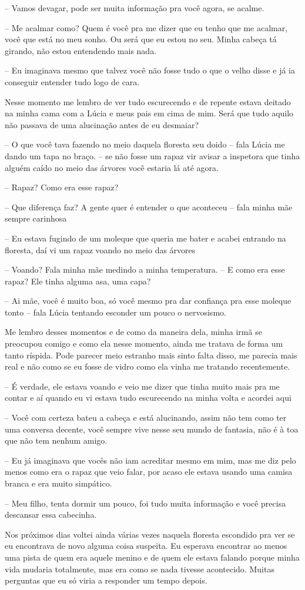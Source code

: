 -- Vamos devagar, pode ser muita informação pra você agora, se acalme.

-- Me acalmar como? Quem é você pra me dizer que eu tenho que me acalmar, você que está no meu sonho. Ou será que eu estou no seu. Minha cabeça tá girando, não estou entendendo mais nada.

-- Eu imaginava mesmo que talvez você não fosse tudo o que o velho disse e já ia conseguir entender tudo logo de cara.

Nesse momento me lembro de ver tudo escurecendo e de repente estava deitado na minha cama com a Lúcia e meus pais em cima de mim. Será que tudo aquilo não passava de uma alucinação antes de eu desmaiar?

-- O que você tava fazendo no meio daquela floresta seu doido -- fala Lúcia me dando um tapa no braço. -- se não fosse um rapaz vir avisar a inspetora que tinha alguém caído no meio das árvores você estaria lá até agora.

-- Rapaz? Como era esse rapaz?

-- Que diferença faz? A gente quer é entender o que aconteceu -- fala minha mãe sempre carinhosa

-- Eu estava fugindo de um moleque que queria me bater e acabei entrando na floresta, daí vi um rapaz voando no meio das árvores

-- Voando? Fala minha mãe medindo a minha temperatura. -- E como era esse rapaz? Ele tinha alguma asa, uma capa?

-- Ai mãe, você é muito boa, só você mesmo pra dar confiança pra esse moleque tonto -- fala Lúcia tentando esconder um pouco o nervosismo.

Me lembro desses momentos e de como da maneira dela, minha irmã se preocupou comigo e como ela nesse momento, ainda me tratava de forma um tanto ríspida. Pode parecer meio estranho mais sinto falta disso, me parecia mais real e não como se eu fosse de vidro como ela vinha me tratando recentemente.

-- É verdade, ele estava voando e veio me dizer que tinha muito mais pra me contar e aí quando eu vi estava tudo escurecendo na minha volta e acordei aqui

-- Você com certeza bateu a cabeça e está alucinando, assim não tem como ter uma conversa decente, você sempre vive nesse seu mundo de fantasia, não é à toa que não tem nenhum amigo.

-- Eu já imaginava que vocês não iam acreditar mesmo em mim, mas me diz pelo menos como era o rapaz que veio falar, por acaso ele estava usando uma camisa branca e era muito simpático.

-- Meu filho, tenta dormir um pouco, foi tudo muita informação e você precisa descansar essa cabecinha.

Nos próximos dias voltei ainda várias vezes naquela floresta escondido pra ver se eu encontrava de novo alguma coisa suspeita. Eu esperava encontrar ao menos uma pista de quem era aquele menino e de quem ele estava falando porque minha vida mudaria totalmente, mas era como se nada tivesse acontecido. Muitas perguntas que eu só viria a responder um tempo depois.




